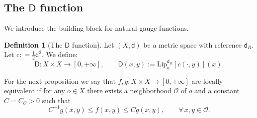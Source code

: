 \documentclass[11pt,a4paper]{article}
\theoremstyle{plain}
\theoremstyle{definition}
\newtheorem{definition}[theorem]{Definition}
\theoremstyle{remark}
\numberwithin{equation}{section}
\newcommand{\sfd}{\mathsf d}
\newcommand{\sfD}{\mathsf D}
\begin{document}
\subsection{The \texorpdfstring{$\sfD$}{D} function}\label{sec:D}

We introduce the building block for natural gauge functions.

\begin{definition}[The $\sfD$ function]\label{def:D}
Let $(X,\sfd)$ be a metric space with reference $\sfd_R$. Let $c: = \frac{1}{2}\sfd^2$. We define:
\begin{equation}
\sfD :X\times X \to [0,+\infty], \qquad \sfD(x,y) := \mathrm{Lip}_a^{\sfd_R} [c(\cdot,y)](x).
\end{equation}
\end{definition}

For the next proposition we say that $f,g:X\times X \to [0,+\infty]$ are locally equivalent if for any $o\in X$ there exists a neighborhood $\mathcal{O}$ of $o$ and a constant $C=C_{\mathcal{O}}>0$ such that
\begin{equation}
C^{-1} g(x,y)\leq f(x,y)\leq C g(x,y),\qquad \forall\, x,y\in\mathcal{O}.
\end{equation}
\end{document}
